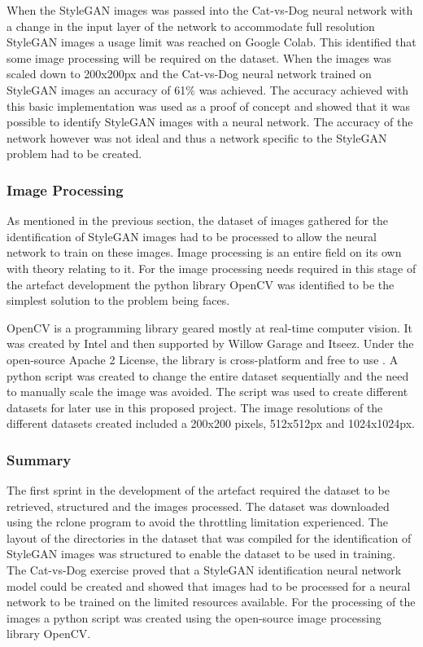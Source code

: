 When the StyleGAN images was passed into the Cat-vs-Dog neural network with a change in the input layer of the network to accommodate full resolution StyleGAN images a usage limit was reached on Google Colab. This identified that some image processing will be required on the dataset. When the images was scaled down to 200x200px and the Cat-vs-Dog neural network trained on StyleGAN images an accuracy of 61\% was achieved. The accuracy achieved with this basic implementation was used as a proof of concept and showed that it was possible to identify StyleGAN images with a neural network. The accuracy of the network however was not ideal and thus a network specific to the StyleGAN problem had to be created.

\subsubsection{Image Processing}

As mentioned in the previous section, the dataset of images gathered for the identification of StyleGAN images had to be processed to allow the neural network to train on these images. Image processing is an entire field on its own with theory relating to it. For the image processing needs required in this stage of the artefact development the python library OpenCV was identified to be the simplest solution to the problem being faces. 

OpenCV is a programming library geared mostly at real-time computer vision. It was created by Intel and then supported by Willow Garage and Itseez. Under the open-source Apache 2 License, the library is cross-platform and free to use \citep{opencv2012}. A python script was created to change the entire dataset sequentially and the need to manually scale the image was avoided. The script was used to create different datasets for later use in this proposed project. The image resolutions of the different datasets created included a 200x200 pixels, 512x512px and 1024x1024px.


\subsubsection{Summary}

The first sprint in the development of the artefact required the dataset to be retrieved, structured and the images processed. The dataset was downloaded using the rclone program to avoid the throttling limitation experienced. The layout of the directories in the dataset that was compiled for the identification of StyleGAN images was structured to enable the dataset to be used in training. The Cat-vs-Dog exercise proved that a StyleGAN identification neural network model could be created and showed that images had to be processed for a neural network to be trained on the limited resources available. For the processing of the images a python script was created using the open-source image processing library OpenCV.

